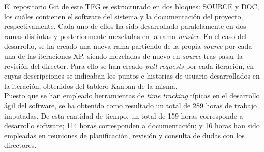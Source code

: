 El repositorio Git de este \gls{TFG} es estructurado en dos bloques: SOURCE y DOC, los cuáles contienen el software del sistema y la documentación del proyecto, respectivamente. Cada uno de ellos ha sido desarrollado paralelamente en dos ramas distintas y posteriormente mezcladas en la rama \textit{master}. En el caso del desarrollo, se ha creado una nueva rama partiendo de la propia \textit{source} por cada una de las iteraciones \gls{XP}, siendo mezcladas de nuevo en \textit{source} tras pasar la revisión del director. Para ello se han creado \textit{pull requests} por cada iteración, en cuyas descripciones se indicaban los puntos e historias de usuario desarrollados en la iteración, obtenidos del tablero Kanban de la misma.\\

Puesto que se han empleado herramientas de \textit{time tracking} típicas en el desarrollo ágil del software, se ha obtenido como resultado un total de 289 horas de trabajo imputadas. De esta cantidad de tiempo, un total de 159 horas corresponde a desarrollo software; 114 horas corresponden a documentación; y 16 horas han sido empleadas en reuniones de planificación, revisión y consulta de dudas con los directores.
